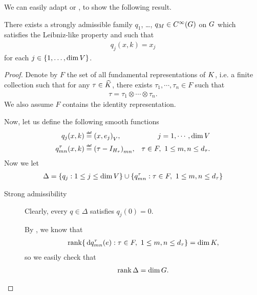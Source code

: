 We can easily adapt \cite[Lemma 4.4]{RuzhanskyTurunenWirth10} or \cite[Corollay 5.13]{Fischer2015},
to show the following result.

\begin{lemma}
\label{lemma:choice_of_polynomials}
    There exists a strongly admissible family $q_1$, \dots, $q_M \in {C^\infty(G)}$ on $G$ which satisfies the Leibniz-like property and such that
    \begin{align*}
        q_j(x, k) = x_j
    \end{align*}
    for each $j \in \{1, \dots, \dim V\}$.
\end{lemma}
\begin{proof}
    Denote by $F$ the set of all fundamental representations of $K$,
    i.e. a finite collection such that for any $\tau \in {\widehat{K}}$,
    there exists $\tau_1, \cdots, \tau_n \in F$ such that
    \begin{align*}
        \tau = \tau_1 \otimes \cdots \otimes \tau_n.
    \end{align*}
    We also assume $F$ contains the identity representation.

    Now,
    let us define the following smooth functions
    \begin{align*}
        q_j(x, k) &\defeq \ip {x} {e_j}, &j = 1, \cdots, \dim \VectorSpace\\
        q^\tau_{m n}(x, k) &\defeq {\left(\tau - \Id {H_\tau}\right)}_{m n},
        &\tau \in F, \ 1 \leq m, n \leq \dimRep \tau.
    \end{align*}
    Now we let
    \begin{align*}
        \Delta = \{q_j : 1 \leq j \leq \dim V\}
        \cup \{q^\tau_{m n} : \tau \in F, \ 1 \leq m, n \leq {d_{\tau}}\}
    \end{align*}

    \begin{description}
        \item [Strong admissibility]
            Clearly, every $q \in \Delta$ satisfies $q_j(0) = 0$.

            By \cite[Lemma 5.11]{Fischer2015},
            we know that
            \begin{align*}
                \operatorname{rank} \{\,\mathrm{d} q^\tau_{m n}(e) : \tau \in F, \ 1 \leq m, n \leq {d_{\tau}}\} = \dim K,
            \end{align*}
            so we easily check that
            \begin{align*}
                \operatorname{rank} \Delta = \dim G.
            \end{align*}


\end{description}
\end{proof}
